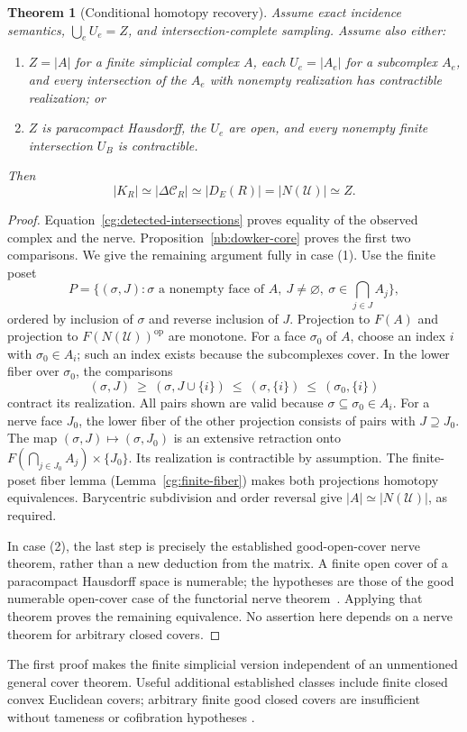 \documentclass[11pt]{article}
\newtheorem{theorem}{Theorem}[section]
\theoremstyle{remark}
\begin{document}
\begin{theorem}[Conditional homotopy recovery]
Assume exact incidence semantics, $\bigcup_eU_e=Z$, and
intersection-complete sampling. Assume also either:
\begin{enumerate}
\item $Z=|A|$ for a finite simplicial complex $A$, each $U_e=|A_e|$
for a subcomplex $A_e$, and every intersection of the $A_e$ with
nonempty realization has contractible realization; or
\item $Z$ is paracompact Hausdorff, the $U_e$ are open, and every
nonempty finite intersection $U_B$ is contractible.
\end{enumerate}
Then
\[
 |K_R|\simeq|\Delta\mathcal C_R|\simeq|D_E(R)|
       =|N(\mathcal U)|\simeq Z.
\]
\end{theorem}
\begin{proof}
Equation~\eqref{cg:detected-intersections} proves equality of the observed
complex and the nerve. Proposition~\ref{nb:dowker-core} proves the first
two comparisons. We give the remaining argument fully in case (1).
Use the finite poset
\[
 P=\{(\sigma,J):\sigma\text{ a nonempty face of }A,\
 J\ne\varnothing,\ \sigma\in\bigcap_{j\in J}A_j\},
\]
ordered by inclusion of $\sigma$ and reverse inclusion of $J$.
Projection to $F(A)$ and projection to $F(N(\mathcal U))^{\mathrm{op}}$
are monotone. For a face $\sigma_0$ of $A$, choose an index $i$ with
$\sigma_0\in A_i$; such an index exists because the subcomplexes cover.
In the lower fiber over $\sigma_0$, the comparisons
\[
 (\sigma,J)\ \geq\ (\sigma,J\cup\{i\})\
 \leq\ (\sigma,\{i\})\ \leq\ (\sigma_0,\{i\})
\]
contract its realization. All pairs shown are valid because
$\sigma\subseteq\sigma_0\in A_i$. For a nerve face $J_0$, the lower
fiber of the other projection consists of pairs with $J\supseteq J_0$.
The map $(\sigma,J)\mapsto(\sigma,J_0)$ is an extensive retraction onto
$F(\bigcap_{j\in J_0}A_j)\times\{J_0\}$. Its realization is contractible
by assumption. The finite-poset fiber lemma
(Lemma~\ref{cg:finite-fiber}) makes both projections homotopy equivalences.
Barycentric subdivision and order reversal give
$|A|\simeq|N(\mathcal U)|$, as required.

In case (2), the last step is precisely the established good-open-cover
nerve theorem, rather than a new deduction from the matrix. A finite open
cover of a paracompact Hausdorff space is numerable; the hypotheses are
those of the good numerable open-cover case of the functorial nerve
theorem~\cite[Theorem 5.9]{cg:nerve}. Applying that theorem proves the
remaining equivalence. No assertion here depends on a nerve theorem for
arbitrary closed covers.
\end{proof}
The first proof makes the finite simplicial version independent of an
unmentioned general cover theorem. Useful additional established classes
include finite closed convex Euclidean covers; arbitrary finite good
closed covers are insufficient without tameness or cofibration hypotheses
\cite[Theorem 3.9 and Remark 5.12]{cg:nerve}.
\end{document}
